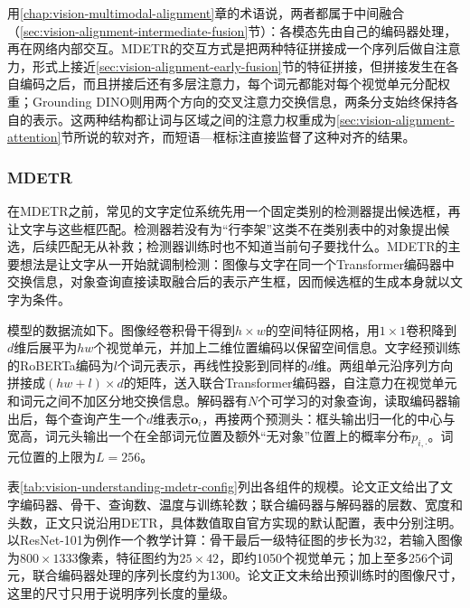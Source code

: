 用\ref{chap:vision-multimodal-alignment}章的术语说，两者都属于中间融合（\ref{sec:vision-alignment-intermediate-fusion}节）：各模态先由自己的编码器处理，再在网络内部交互。MDETR的交互方式是把两种特征拼接成一个序列后做自注意力，形式上接近\ref{sec:vision-alignment-early-fusion}节的特征拼接，但拼接发生在各自编码之后，而且拼接后还有多层注意力，每个词元都能对每个视觉单元分配权重；Grounding DINO则用两个方向的交叉注意力交换信息，两条分支始终保持各自的表示。这两种结构都让词与区域之间的注意力权重成为\ref{sec:vision-alignment-attention}节所说的软对齐，而短语—框标注直接监督了这种对齐的结果。

\subsubsection{MDETR}
\label{sec:vision-understanding-mdetr}

在MDETR之前，常见的文字定位系统先用一个固定类别的检测器提出候选框，再让文字与这些框匹配。检测器若没有为“行李架”这类不在类别表中的对象提出候选，后续匹配无从补救；检测器训练时也不知道当前句子要找什么。MDETR的主要想法是让文字从一开始就调制检测：图像与文字在同一个Transformer编码器中交换信息，对象查询直接读取融合后的表示产生框，因而候选框的生成本身就以文字为条件。

模型的数据流如下。图像经卷积骨干得到$h\times w$的空间特征网格，用$1\times1$卷积降到$d$维后展平为$hw$个视觉单元，并加上二维位置编码以保留空间信息。文字经预训练的RoBERTa编码为$l$个词元表示，再线性投影到同样的$d$维。两组单元沿序列方向拼接成$(hw+l)\times d$的矩阵，送入联合Transformer编码器，自注意力在视觉单元和词元之间不加区分地交换信息。解码器有$N$个可学习的对象查询，读取编码器输出后，每个查询产生一个$d$维表示$\bm o_i$，再接两个预测头：框头输出归一化的中心与宽高，词元头输出一个在全部词元位置及额外“无对象”位置上的概率分布$p_{i,\cdot}$。词元位置的上限为$L=256$。

表\ref{tab:vision-understanding-mdetr-config}列出各组件的规模。论文正文给出了文字编码器、骨干、查询数、温度与训练轮数；联合编码器与解码器的层数、宽度和头数，正文只说沿用DETR，具体数值取自官方实现的默认配置，表中分别注明。以ResNet-101为例作一个教学计算：骨干最后一级特征图的步长为32，若输入图像为$800\times1333$像素，特征图约为$25\times42$，即约1050个视觉单元；加上至多256个词元，联合编码器处理的序列长度约为1300。论文正文未给出预训练时的图像尺寸，这里的尺寸只用于说明序列长度的量级。

